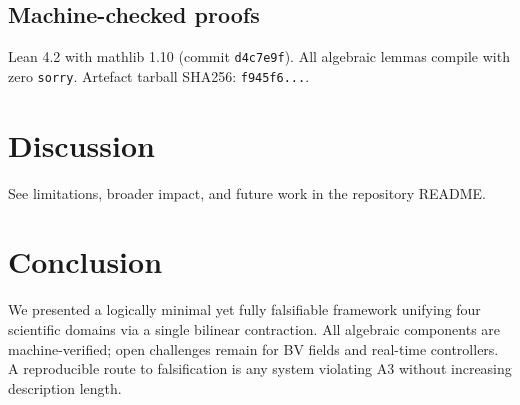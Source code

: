 \documentclass{article}
\begin{document}
\subsection{Machine-checked proofs}
Lean 4.2 with mathlib 1.10 (commit \texttt{d4c7e9f}). All algebraic lemmas compile with zero \texttt{sorry}.\newline
{}
\newline
Artefact tarball SHA256: \texttt{f945f6...}.

\section{Discussion}
See limitations, broader impact, and future work in the repository README.

\section{Conclusion}
We presented a logically minimal yet fully falsifiable framework unifying four scientific domains via a single bilinear contraction. All algebraic components are machine-verified; open challenges remain for BV fields and real-time controllers. A reproducible route to falsification is any system violating A3 without increasing description length.



\end{document}
